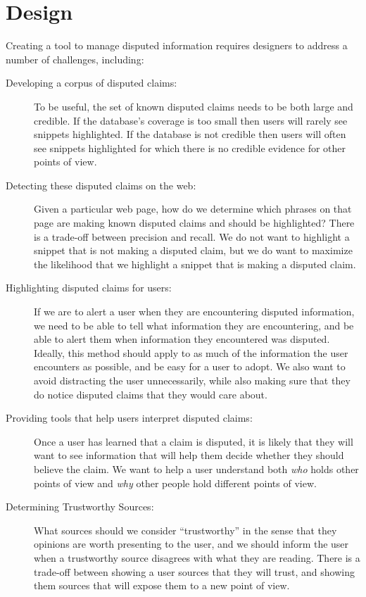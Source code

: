 \documentclass{www2010-submission}
\begin{document}
\section{Design}

Creating a tool to manage disputed information requires designers to address a number of challenges, including:

\begin{description}
\item[Developing a corpus of disputed claims:] To be useful, the set of known disputed claims needs to be both large and credible. If the database's coverage is too small then users will rarely see snippets highlighted. If the database is not credible then users will often see snippets highlighted for which there is no credible evidence for other points of view.

\item[Detecting these disputed claims on the web:] Given a particular web page, how do we determine which phrases on that page are making known disputed claims and should be highlighted? There is a trade-off between precision and recall. We do not want to highlight a snippet that is not making a disputed claim, but we do want to maximize the likelihood that we highlight a snippet that is making a disputed claim.

\item[Highlighting disputed claims for users:] If we are to alert a user when they are encountering disputed information, we need to be able to tell what information they are encountering, and be able to alert them when information they encountered was disputed. Ideally, this method should apply to as much of the information the user encounters as possible, and be easy for a user to adopt. We also want to avoid distracting the user unnecessarily, while also making sure that they do notice disputed claims that they would care about.

\item[Providing tools that help users interpret disputed claims:] Once a user has learned that a claim is disputed, it is likely that they will want to see information that will help them decide whether they should believe the claim. We want to help a user understand both {\it who} holds other points of view and {\it why} other people hold different points of view.

\item[Determining Trustworthy Sources:] What sources should we consider ``trustworthy'' in the sense that they opinions are worth presenting to the user, and we should inform the user when a trustworthy source disagrees with what they are reading. There is a trade-off between showing a user sources that they will trust, and showing them sources that will expose them to a new point of view.

\end{description}
\end{document}
